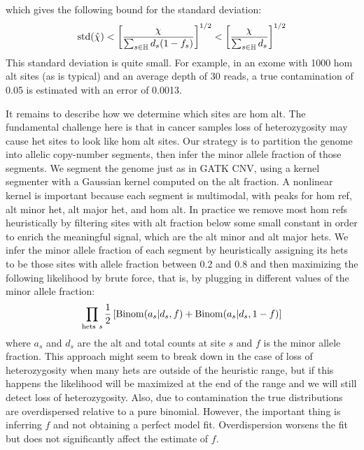 \documentclass[nofootinbib,amssymb,amsmath]{revtex4}
\begin{document}
which gives the following bound for the standard deviation:
\begin{equation}
{\rm std}(\hat{\chi}) < \left[ \frac{ \chi }{  \sum_{s \in \mathbb{H}} d_s (1 - f_s) } \right]^{1/2} < \left[ \frac{ \chi }{  \sum_{s \in \mathbb{H}} d_s} \right]^{1/2}
\end{equation}
This standard deviation is quite small.  For example, in an exome with 1000 hom alt sites (as is typical) and an average depth of 30 reads, a true contamination of 0.05 is estimated with an error of 0.0013.

It remains to describe how we determine which sites are hom alt.  The fundamental challenge here is that in cancer samples loss of heterozygosity may cause het sites to look like hom alt sites.  Our strategy is to partition the genome into allelic copy-number segments, then infer the minor allele fraction of those segments.  We segment the genome just as in GATK CNV, using a kernel segmenter with a Gaussian kernel computed on the alt fraction.  A nonlinear kernel is important because each segment is multimodal, with peaks for hom ref, alt minor het, alt major het, and hom alt.  In practice we remove most hom refs heuristically by filtering sites with alt fraction below some small constant in order to enrich the meaningful signal, which are the alt minor and alt major hets.  We infer the minor allele fraction of each segment by heuristically assigning its hets to be those sites with allele fraction between 0.2 and 0.8 and then maximizing the following likelihood by brute force, that is, by plugging in different values of the minor allele fraction:
\begin{equation}
\prod_{{\rm hets~}s} \frac{1}{2} \left[ {\rm Binom}(a_s | d_s, f) + {\rm Binom}(a_s | d_s, 1 - f)    \right] \label{het-maf}
\end{equation}
where $a_s$ and $d_s$ are the alt and total counts at site $s$ and $f$ is the minor allele fraction.  This approach might seem to break down in the case of loss of heterozygosity when many hets are outside of the heuristic range, but if this happens the likelihood will be maximized at the end of the range and we will still detect loss of heterozygosity.  Also, due to contamination the true distributions are overdispersed relative to a pure binomial.  However, the important thing is inferring $f$ and not obtaining a perfect model fit.  Overdispersion worsens the fit but does not significantly affect the estimate of $f$.
\end{document}
